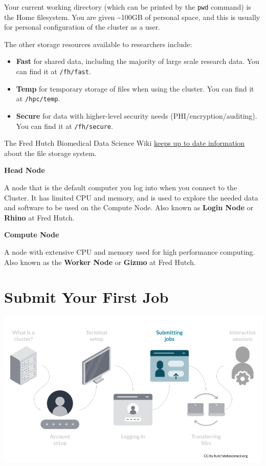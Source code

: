 \documentclass[
]{book}
\begin{document}
Your current working directory (which can be printed by the \texttt{pwd} command) is the Home filesystem. You are given \textasciitilde100GB of personal space, and this is usually for personal configuration of the cluster as a user.

The other storage resources available to researchers include:

\begin{itemize}
\item
  \textbf{Fast} for shared data, including the majority of large scale research data. You can find it at \texttt{/fh/fast}.
\item
  \textbf{Temp} for temporary storage of files when using the cluster. You can find it at \texttt{/hpc/temp}.
\item
  \textbf{Secure} for data with higher-level security needs (PHI/encryption/auditing). You can find it at \texttt{/fh/secure}.
\end{itemize}

The Fred Hutch Biomedical Data Science Wiki \href{https://sciwiki.fredhutch.org/scicomputing/store_posix/}{keeps up to date information} about the file storage system.

\textbf{Head Node}

A node that is the default computer you log into when you connect to the Cluster. It has limited CPU and memory, and is used to explore the needed data and software to be used on the Compute Node. Also known as \textbf{Login Node} or \textbf{Rhino} at Fred Hutch.

\textbf{Compute Node}

A node with extensive CPU and memory used for high performance computing. Also known as the \textbf{Worker Node} or \textbf{Gizmo} at Fred Hutch.

\hypertarget{submit-your-first-job}{%
\chapter{Submit Your First Job}\label{submit-your-first-job}}

\begin{center}\includegraphics[width=0.8\linewidth]{resources/images/06-first-job_files/figure-latex//1BQxrVYdKZTbpCaF-i_q9w7s9x034lEXpQZDU-Sl09cs_gff2211b72f_1_229} \end{center}
\end{document}
